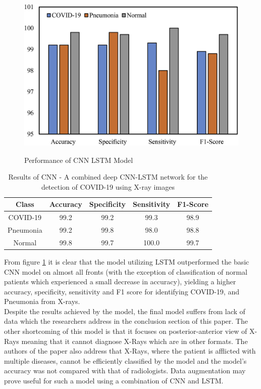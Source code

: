  \begin{figure}[H]
    \centering
    \includegraphics[width=1\textwidth,height=0.5\textheight]{Images/performanceOfCNNLSTM-LSTMPaper.png}\\
    \caption{Performance of CNN LSTM Model\cite{litReviewCnnLstm}}
    \label{fig:Performance of CNN LSTM Model Literature Review}
\end{figure}
\vspace{0.5mm}
\begin{table}[h]
    \centering
    \begin{tabular}{|c|c|c|c|c|}
    \hline
         Class
         & Accuracy
         & Specificity
         & Sensitivity
         & F1-Score\\
         \hline
         COVID-19 & 99.2 &  99.2 & 99.3 & 98.9 \\
         Pneumonia & 99.2 & 99.8 & 98.0 & 98.8 \\
         Normal & 99.8 & 99.7 & 100.0 & 99.7\\
         \hline
    \end{tabular}
    \caption{Results of CNN - A combined deep CNN-LSTM network for the detection of COVID-19 using X-ray images}
    \label{tab:Results of CNN LSTM - A combined deep CNN-LSTM network for the detection of novel coronavirus (COVID-19) using X-ray images}
\end{table}
From figure \ref{fig:Performance of CNN LSTM Model Literature Review} it is clear that the model utilizing LSTM outperformed the basic CNN model on almost all fronts (with the exception of classification of normal patients which experienced a small decrease in accuracy), yielding a higher accuracy, specificity, sensitivity and F1 score for identifying COVID-19, and Pneumonia from X-rays.
\\
Despite the results achieved by the model, the final model suffers from lack of data which the researchers address in the conclusion section of this paper.  The other shortcoming of this model is that it focuses on posterior-anterior view of X-Rays meaning that it cannot diagnose X-Rays which are in other formats.  The authors of the paper also address that X-Rays, where the patient is afflicted with multiple diseases, cannot be efficiently classified by the model and the model's accuracy was not compared with that of radiologists.  Data augmentation may prove useful for such a model using a combination of CNN and LSTM.
\\
